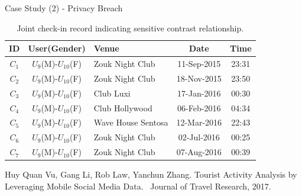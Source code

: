 \documentclass[
 size=14pt,
 paper=smartboard,  %
 mode=present, 		%
 display=slides, 	%
 style=tuliplab,  	%
 pauseslide,
 fleqn,leqno]{powerdot}
\begin{document}


\begin{slide}[toc=,bm=]{Case Study (2) - Privacy Breach}

\begin{table}
	\setlength{\abovecaptionskip}{0pt}
	\setlength{\belowcaptionskip}{12pt}
	\centering
	\caption{Joint check-in record indicating sensitive contrast relationship\protect\footnotemark[1].}
	\begin{tabular}{c|c|l|c|c}	
	\toprule	
	ID  	&  	\textbf{User(Gender)}& 	\textbf{Venue} 		& 	\textbf{Date} 	&	\textbf{Time}	\\
	\midrule
	$C_1$	&	$U_9$(M)-$U_{10}$(F)	 &	Zouk Night Club		&	11-Sep-2015	    &	23:31\\
	$C_2$	&	$U_9$(M)-$U_{10}$(F)	 &	Zouk Night Club		&	18-Nov-2015	    &	23:50\\
	$C_3$	&	$U_9$(M)-$U_{10}$(F)	 &	Club Luxi			&	17-Jan-2016	    &	00:30\\
	$C_4$	&	$U_9$(M)-$U_{10}$(F)	 &	Club Hollywood		&	06-Feb-2016     &	04:34\\
	$C_5$	&	$U_9$(M)-$U_{10}$(F)	 &	Wave House Sentosa	&	12-Mar-2016	    &	22:43\\
	$C_6$	&	$U_9$(M)-$U_{10}$(F)	 &	Zouk Night Club		&	02-Jul-2016	    &	00:25\\
	$C_7$	&	$U_9$(M)-$U_{10}$(F)	 &	Zouk Night Club		&	07-Aug-2016	    &	00:39\\
	\bottomrule
	\end{tabular}
\end{table}

\begin{thebibliography}{}
\bibitem{}
\small{Huy Quan Vu, Gang Li, Rob Law, Yanchun Zhang.
Tourist Activity Analysis by Leveraging Mobile Social Media Data. 
Journal of Travel Research, 2017.}
\end{thebibliography}

\end{slide}
\end{document}
